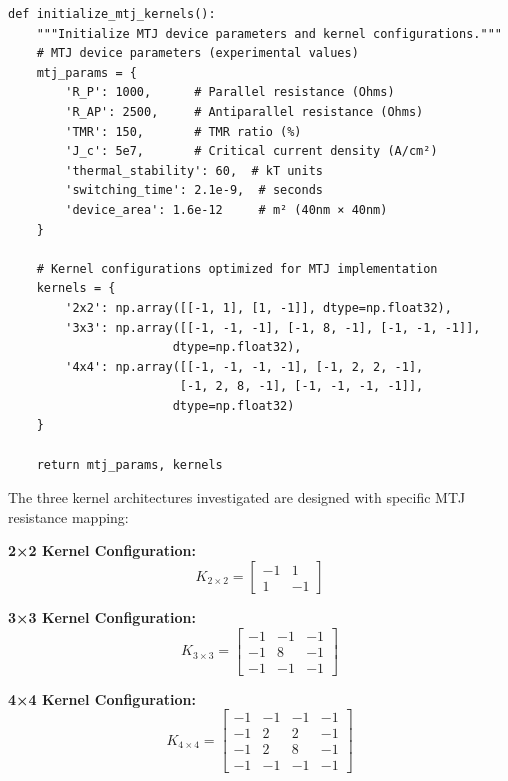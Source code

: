 \documentclass[conference]{IEEEtran}
\begin{document}
\begin{lstlisting}[caption={MTJ kernel implementation with device parameters}]
def initialize_mtj_kernels():
    """Initialize MTJ device parameters and kernel configurations."""
    # MTJ device parameters (experimental values)
    mtj_params = {
        'R_P': 1000,      # Parallel resistance (Ohms)
        'R_AP': 2500,     # Antiparallel resistance (Ohms) 
        'TMR': 150,       # TMR ratio (%)
        'J_c': 5e7,       # Critical current density (A/cm²)
        'thermal_stability': 60,  # kT units
        'switching_time': 2.1e-9,  # seconds
        'device_area': 1.6e-12     # m² (40nm × 40nm)
    }
    
    # Kernel configurations optimized for MTJ implementation
    kernels = {
        '2x2': np.array([[-1, 1], [1, -1]], dtype=np.float32),
        '3x3': np.array([[-1, -1, -1], [-1, 8, -1], [-1, -1, -1]], 
                       dtype=np.float32),
        '4x4': np.array([[-1, -1, -1, -1], [-1, 2, 2, -1], 
                        [-1, 2, 8, -1], [-1, -1, -1, -1]], 
                       dtype=np.float32)
    }
    
    return mtj_params, kernels
\end{lstlisting}

The three kernel architectures investigated are designed with specific MTJ resistance mapping:

\textbf{2×2 Kernel Configuration:}
\begin{equation}
K_{2×2} = \begin{bmatrix} -1 & 1 \\ 1 & -1 \end{bmatrix}
\end{equation}

\textbf{3×3 Kernel Configuration:}
\begin{equation}
K_{3×3} = \begin{bmatrix} -1 & -1 & -1 \\ -1 & 8 & -1 \\ -1 & -1 & -1 \end{bmatrix}
\end{equation}

\textbf{4×4 Kernel Configuration:}
\begin{equation}
K_{4×4} = \begin{bmatrix} -1 & -1 & -1 & -1 \\ -1 & 2 & 2 & -1 \\ -1 & 2 & 8 & -1 \\ -1 & -1 & -1 & -1 \end{bmatrix}
\end{equation}
\end{document}
